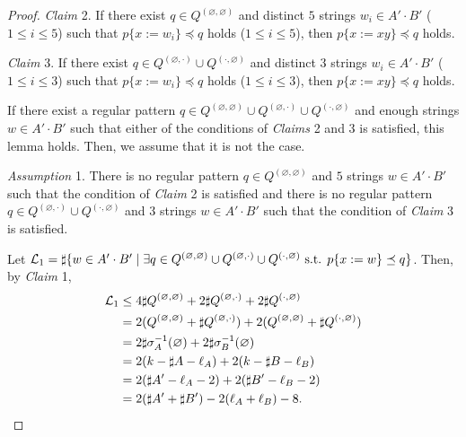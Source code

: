 \begin{proof}
\smallskip

\noindent
\textit{Claim} 2. If there exist $q \in Q^{(\varnothing,\varnothing)}$ and distinct $5$ strings $w_{i} \in A'\cdot B'$ ($1\leq i\leq 5$) such  that $p \{ x:=w_{i} \} \preceq q$ holds ($1\leq i\leq 5$),  then $p \{ x:=xy \} \preceq q$ holds.

\smallskip

\noindent
\textit{Claim} 3. If there exist $q \in Q^{(\varnothing,\cdot)} \cup Q^{(\cdot,\varnothing)}$ and distinct $3$ strings $w_{i} \in A'\cdot B'$ ($1\leq i\leq 3$) such that $p \{ x:=w_{i} \} \preceq q$ holds ($1\leq i\leq 3$),  then $p \{ x:=xy \} \preceq q$ holds.

\smallskip

\noindent
If there exist a regular pattern $q \in Q^{(\varnothing,\varnothing)} \cup Q^{(\varnothing,\cdot)} \cup Q^{(\cdot,\varnothing)}$ and enough strings $w \in A'\cdot B'$ such that either of the conditions of \textit{Claims} 2 and 3 is satisfied, this lemma holds. Then, we assume that it is not the case.

\smallskip

\noindent
\textit{Assumption} 1.
There is no regular pattern $q \in Q^{(\varnothing,\varnothing)}$ and $5$ strings $w \in A'\cdot B'$ such that the condition of \textit{Claim} 2 is satisfied and there is no regular pattern $q \in Q^{(\varnothing,\cdot)} \cup Q^{(\cdot,\varnothing)}$ and $3$ strings $w \in A'\cdot B'$ such that the condition of \textit{Claim} 3 is satisfied.

\smallskip

\noindent
Let ${\cal L}_{1} = \sharp\{w \in A'\cdot B' \mid \exists q \in Q^{(\varnothing,\varnothing)} \cup Q^{(\varnothing,\cdot)} \cup Q^{(\cdot,\varnothing)} \mbox{ s.t. } p\{x:=w\} \preceq q\}$.
Then, by \textit{Claim} 1,
\begin{align*}
  {\cal L}_{1} &\leq 4\sharp Q^{(\varnothing,\varnothing)} + 2\sharp Q^{(\varnothing,\cdot)} + 2\sharp Q^{(\cdot,\varnothing)}\\
  & = 2(Q^{(\varnothing,\varnothing)} + \sharp Q^{(\varnothing,\cdot)}) + 2(Q^{(\varnothing,\varnothing)} + \sharp Q^{(\cdot,\varnothing)})\\
  & = 2\sharp \sigma_{A}^{-1}(\varnothing) + 2\sharp \sigma_{B}^{-1}(\varnothing)\\
  & = 2(k - \sharp A - \ell_{A}) + 2(k - \sharp B - \ell_{B})\\
  & = 2(\sharp A' - \ell_{A} - 2) + 2(\sharp B' - \ell_{B} - 2)\\
  & = 2(\sharp A' + \sharp B') - 2(\ell_{A} + \ell_{B}) - 8.
\end{align*}


\end{proof}

